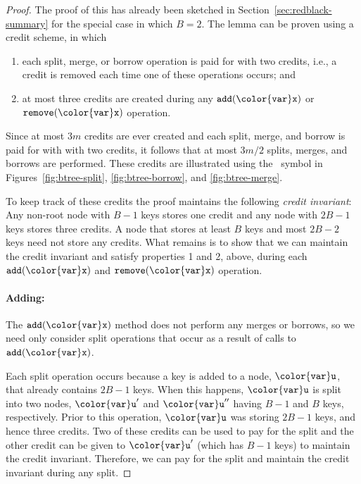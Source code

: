 \documentclass[10pt]{book}
\newcommand{\secref}[1]{Section~\ref{sec:#1}}
\theoremstyle{plain}
\theoremstyle{definition}
\begin{document}
\begin{proof}
   The proof of this has already been sketched in
   \secref{redblack-summary} for the special case in which $B=2$.
   The lemma can be proven using a credit scheme,
   in which
  \begin{enumerate}
    \item each split, merge, or borrow operation is paid for with two
      credits, i.e., a credit is removed each time one of these operations
      occurs; and
    \item at most three credits are created during any \ensuremath{\mathtt{add({\color{var}x})}} or
      \ensuremath{\mathtt{remove({\color{var}x})}} operation.
  \end{enumerate}
  Since at most $3m$ credits are ever created and each split,
  merge, and borrow is paid for with with two credits, it follows
  that at most $3m/2$ splits, merges, and borrows are performed.
  These credits are illustrated using the \cent\ symbol in
  Figures~\ref{fig:btree-split}, \ref{fig:btree-borrow}, and
  \ref{fig:btree-merge}.

  To keep track of these credits the proof maintains the following
  \emph{credit invariant}:
  Any non-root node with $B-1$ keys stores one
  credit and any node with $2B-1$ keys stores three credits.  A node
  that stores at least $B$ keys and most $2B-2$ keys need not store
  any credits.  What remains is to show that we can maintain the credit
  invariant and satisfy properties 1 and 2, above, during each \ensuremath{\mathtt{add({\color{var}x})}}
  and \ensuremath{\mathtt{remove({\color{var}x})}} operation.

  \paragraph{Adding:}
  The \ensuremath{\mathtt{add({\color{var}x})}} method does not perform any merges or borrows, so we
  need only consider split operations that occur as a result of calls
  to \ensuremath{\mathtt{add({\color{var}x})}}.

  Each split operation occurs because a key is added to a node, \ensuremath{\mathtt{{\color{var}u}}}, that
  already contains $2B-1$ keys.  When this happens, \ensuremath{\mathtt{{\color{var}u}}} is split into two
  nodes, \ensuremath{\mathtt{{\color{var}u}'}} and \ensuremath{\mathtt{{\color{var}u}''}} having $B-1$ and $B$ keys, respectively.  Prior to
  this operation, \ensuremath{\mathtt{{\color{var}u}}} was storing $2B-1$ keys, and hence three credits.
  Two of these credits can be used to pay for the split and the other
  credit can be given to \ensuremath{\mathtt{{\color{var}u}'}} (which has $B-1$ keys) to maintain the
  credit invariant.  Therefore, we can pay for the split and maintain
  the credit invariant during any split.


\end{proof}
\end{document}
